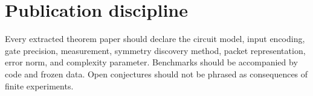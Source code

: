 \section{Publication discipline}
Every extracted theorem paper should declare the circuit model, input encoding, gate precision, measurement, symmetry discovery method, packet representation, error norm, and complexity parameter. Benchmarks should be accompanied by code and frozen data. Open conjectures should not be phrased as consequences of finite experiments.
